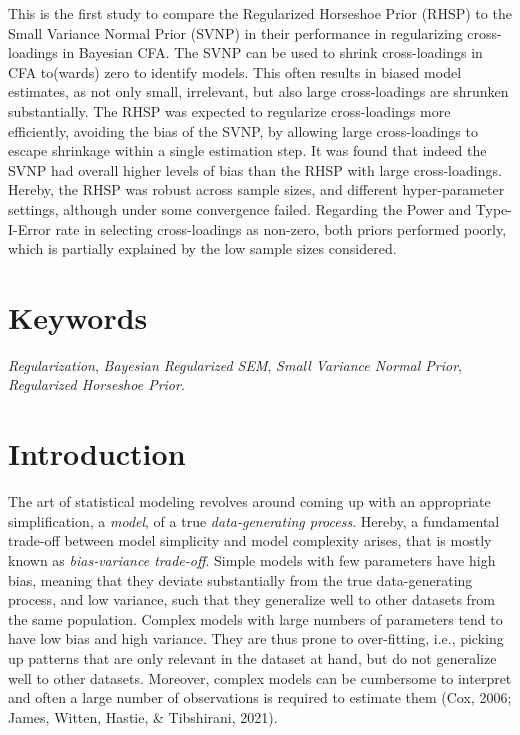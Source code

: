 \documentclass[
  man, donotrepeattitle,floatsintext]{apa6}
\begin{document}
This is the first study to compare the Regularized Horseshoe Prior (RHSP) to the Small Variance Normal Prior (SVNP) in their performance in regularizing cross-loadings in Bayesian CFA. The SVNP can be used to shrink cross-loadings in CFA to(wards) zero to identify models. This often results in biased model estimates, as not only small, irrelevant, but also large cross-loadings are shrunken substantially. The RHSP was expected to regularize cross-loadings more efficiently, avoiding the bias of the SVNP, by allowing large cross-loadings to escape shrinkage within a single estimation step. It was found that indeed the SVNP had overall higher levels of bias than the RHSP with large cross-loadings. Hereby, the RHSP was robust across sample sizes, and different hyper-parameter settings, although under some convergence failed. Regarding the Power and Type-I-Error rate in selecting cross-loadings as non-zero, both priors performed poorly, which is partially explained by the low sample sizes considered.

\vfill

\hypertarget{keywords}{%
\section{Keywords}\label{keywords}}

\emph{Regularization}, \emph{Bayesian Regularized SEM}, \emph{Small Variance Normal Prior}, \emph{Regularized Horseshoe Prior}.

\clearpage

\hypertarget{introduction}{%
\section{Introduction}\label{introduction}}

The art of statistical modeling revolves around coming up with an appropriate simplification, a \emph{model}, of a true \emph{data-generating process}. Hereby, a fundamental trade-off between model simplicity and model complexity arises, that is mostly known as \emph{bias-variance trade-off}. Simple models with few parameters have high bias, meaning that they deviate substantially from the true data-generating process, and low variance, such that they generalize well to other datasets from the same population. Complex models with large numbers of parameters tend to have low bias and high variance. They are thus prone to over-fitting, i.e., picking up patterns that are only relevant in the dataset at hand, but do not generalize well to other datasets. Moreover, complex models can be cumbersome to interpret and often a large number of observations is required to estimate them (Cox, 2006; James, Witten, Hastie, \& Tibshirani, 2021).
\end{document}
